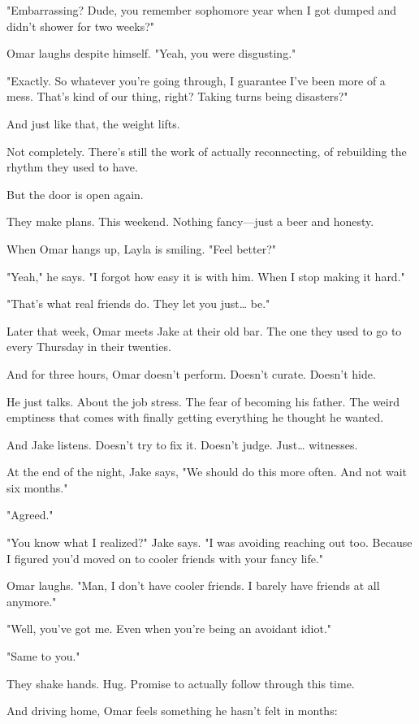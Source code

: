 \documentclass[11pt,twoside]{book}
\begin{document}
"Embarrassing? Dude, you remember sophomore year when I got dumped and didn't shower for two weeks?"

Omar laughs despite himself. "Yeah, you were disgusting."

"Exactly. So whatever you're going through, I guarantee I've been more of a mess. That's kind of our thing, right? Taking turns being disasters?"

And just like that, the weight lifts.

Not completely. There's still the work of actually reconnecting, of rebuilding the rhythm they used to have.

But the door is open again.

They make plans. This weekend. Nothing fancy—just a beer and honesty.

When Omar hangs up, Layla is smiling. "Feel better?"

"Yeah," he says. "I forgot how easy it is with him. When I stop making it hard."

"That's what real friends do. They let you just\ldots{} be."

Later that week, Omar meets Jake at their old bar. The one they used to go to every Thursday in their twenties.

And for three hours, Omar doesn't perform. Doesn't curate. Doesn't hide.

He just talks. About the job stress. The fear of becoming his father. The weird emptiness that comes with finally getting everything he thought he wanted.

And Jake listens. Doesn't try to fix it. Doesn't judge. Just\ldots{} witnesses.

At the end of the night, Jake says, "We should do this more often. And not wait six months."

"Agreed."

"You know what I realized?" Jake says. "I was avoiding reaching out too. Because I figured you'd moved on to cooler friends with your fancy life."

Omar laughs. "Man, I don't have cooler friends. I barely have friends at all anymore."

"Well, you've got me. Even when you're being an avoidant idiot."

"Same to you."

They shake hands. Hug. Promise to actually follow through this time.

And driving home, Omar feels something he hasn't felt in months:
\end{document}
